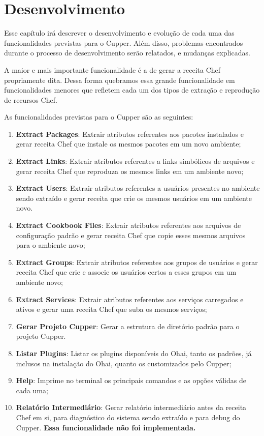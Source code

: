 \chapter{Desenvolvimento}
\label{chap:dev}

Esse capítulo irá descrever o desenvolvimento e evolução de cada uma das funcionalidades
previstas para o Cupper. Além disso, problemas encontrados durante o processo
de desenvolvimento serão relatados, e mudanças explicadas.

A maior e mais importante funcionalidade é a de gerar a receita Chef propriamente dita.
Dessa forma quebramos essa grande funcionalidade em funcionalidades menores que refletem cada
um dos tipos de extração e reprodução de recursos Chef.

As funcionalidades previstas para o Cupper são as seguintes:

\begin{enumerate}
  \item \textbf{Extract Packages}: Extrair atributos referentes aos pacotes
instalados e gerar receita Chef que instale os mesmos pacotes em um novo ambiente;
  \item \textbf{Extract Links}: Extrair atributos referentes a links simbólicos
de arquivos e gerar receita Chef que reproduza os mesmos links em um ambiente novo;
  \item \textbf{Extract Users}: Extrair atributos referentes a usuários presentes
no ambiente sendo extraído e gerar receita que crie os mesmos usuários em um
ambiente novo.
  \item \textbf{Extract Cookbook Files}: Extrair atributos referentes aos arquivos
de configuração padrão e gerar receita Chef que copie esses mesmos arquivos para o ambiente novo;
  \item \textbf{Extract Groups}: Extrair atributos referentes aos grupos de usuários
e gerar receita Chef que crie e associe os usuários certos a esses grupos em um
ambiente novo;
  \item \textbf{Extract Services}: Extrair atributos referentes aos serviços carregados
e ativos e gerar uma receita Chef que suba os mesmos serviços;
  \item \textbf{Gerar Projeto Cupper}: Gerar a estrutura de diretório padrão 
para o projeto Cupper.
  \item \textbf{Listar Plugins}: Listar os plugins disponíveis do Ohai, tanto 
os padrões, já inclusos na instalação do Ohai, quanto os customizados pelo Cupper;
  \item \textbf{Help}: Imprime no terminal os principais comandos e as opções
válidas de cada uma;
  \item \textbf{Relatório Intermediário}: Gerar relatório intermediário antes
da receita Chef em si, para diagnóstico do sistema sendo extraído e para debug
do Cupper. \textbf{Essa funcionalidade não foi implementada.}

\end{enumerate}

